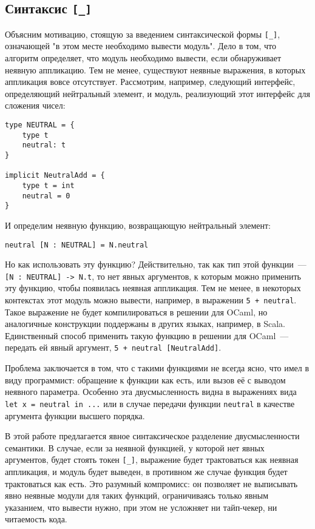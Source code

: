 \documentclass[../diploma.tex]{subfiles}
\begin{document}
\subsection{Синтаксис \texttt{[\_]}}

Объясним мотивацию, стоящую за введением синтаксической формы \texttt{[\_]}, означающей "в этом месте необходимо вывести модуль". Дело в том, что алгоритм определяет, что модуль необходимо вывести, если обнаруживает неявную аппликацию. Тем не менее, существуют неявные выражения, в которых аппликация вовсе отсутствует. Рассмотрим, например, следующий интерфейс, определяющий нейтральный элемент, и модуль, реализующий этот интерфейс для сложения чисел:

\begin{verbatim}
type NEUTRAL = {
    type t
    neutral: t
}

implicit NeutralAdd = {
    type t = int
    neutral = 0
}
\end{verbatim}

И определим неявную функцию, возвращающую нейтральный элемент:

\begin{verbatim}
neutral [N : NEUTRAL] = N.neutral
\end{verbatim}

Но как использовать эту функцию? Действительно, так как тип этой функции~--- \texttt{[N : NEUTRAL] -> N.t}, то нет явных аргументов, к которым можно применить эту функцию, чтобы появилась неявная аппликация. Тем не менее, в некоторых контекстах этот модуль можно вывести, например, в выражении \texttt{5 + neutral}. Такое выражение не будет компилироваться в решении для OCaml, но аналогичные конструкции поддержаны в других языках, например, в Scala. Единственный способ применить такую функцию в решении для OCaml~--- передать ей явный аргумент, \texttt{5 + neutral [NeutralAdd]}.

Проблема заключается в том, что с такими функциями не всегда ясно, что имел в виду программист: обращение к функции как есть, или вызов её с выводом неявного параметра. Особенно эта двусмысленность видна в выражениях вида \texttt{let x = neutral in ...} или в случае передачи функции \texttt{neutral} в качестве аргумента функции высшего порядка. 

В этой работе предлагается явное синтаксическое разделение двусмысленности семантики. В случае, если за неявной функцией, у которой нет явных аргументов, будет стоять токен \texttt{[\_]}, выражение будет трактоваться как неявная аппликация, и модуль будет выведен, в противном же случае функция будет трактоваться как есть. Это разумный компромисс: он позволяет не выписывать явно неявные модули для таких функций, ограничиваясь только явным указанием, что вывести нужно, при этом не усложняет ни тайп-чекер, ни читаемость кода.
\end{document}

